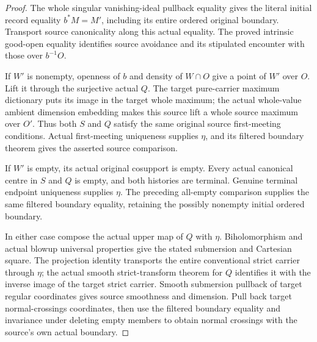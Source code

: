 \begin{proof}
The whole singular vanishing-ideal pullback equality gives the literal
initial record equality $b^*M=M'$, including its entire ordered original
boundary.  Transport source canonicality along this actual equality.
The proved intrinsic good-open equality identifies source avoidance and
its stipulated encounter with those over $b^{-1}O$.

If $W'$ is nonempty, openness of $b$ and density of $W\cap O$ give a
point of $W'$ over $O$.  Lift it through the surjective actual $Q$.
The target pure-carrier maximum dictionary puts its image in the target
whole maximum; the actual whole-value ambient dimension embedding
makes this source lift a whole source maximum over $O'$.  Thus both
$S$ and $Q$ satisfy the same original source first-meeting conditions.
Actual first-meeting uniqueness supplies $\eta$, and its filtered
boundary theorem gives the asserted source comparison.

If $W'$ is empty, its actual original cosupport is empty.  Every actual
canonical centre in $S$ and $Q$ is empty, and both histories are
terminal.  Genuine terminal endpoint uniqueness supplies $\eta$.
The preceding all-empty comparison supplies the same filtered boundary
equality, retaining the possibly nonempty initial ordered boundary.

In either case compose the actual upper map of $Q$ with $\eta$.
Biholomorphism and actual blowup universal properties give the stated
submersion and Cartesian square.  The projection identity transports
the entire conventional strict carrier through $\eta$; the actual
smooth strict-transform theorem for $Q$ identifies it with the inverse
image of the target strict carrier.  Smooth submersion pullback of
target regular coordinates gives source smoothness and dimension.
Pull back target normal-crossings coordinates, then use the filtered
boundary equality and invariance under deleting empty members to
obtain normal crossings with the source's own actual boundary.
\end{proof}

